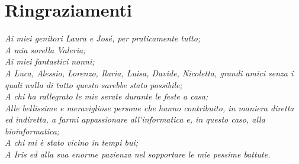 \chapter*{\centering Ringraziamenti}
\begin{flushright}
    \textit{
        Ai miei genitori Laura e José, per praticamente tutto; \\
        A mia sorella Valeria; \\
        Ai miei fantastici nonni; \\
        A Luca, Alessio, Lorenzo, Ilaria, Luisa, Davide, Nicoletta, grandi amici senza i quali nulla di tutto questo sarebbe stato possibile; \\
        A chi ha rallegrato le mie serate durante le feste a casa; \\
        Alle bellissime e meravigliose persone che hanno contribuito, in maniera diretta ed indiretta, a farmi appassionare all'informatica e, in questo caso, alla bioinformatica; \\
        A chi mi è stato vicino in tempi bui; \\
        A Iris ed alla sua enorme pazienza nel sopportare le mie pessime battute.
    }
\end{flushright}

 \null
